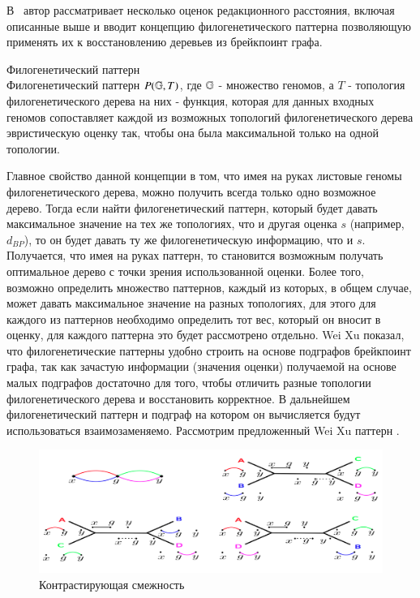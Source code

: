 В~\cite{xu2010exploring} автор рассматривает несколько оценок редакционного расстояния, включая описанные выше
и вводит концепцию филогенетического паттерна позволяющую применять их к восстановлению деревьев из брейкпоинт графа.
\begin{define}{Филогенетический паттерн} \\
  Филогенетический паттерн $P(\mathbb{G}, T)$, где $\mathbb{G}$ - множество геномов,
  а $T$ - топология филогенетического дерева на них - функция, которая для данных входных геномов
  сопоставляет каждой из возможных топологий филогенетического дерева эвристическую оценку так,
  чтобы она была максимальной только на одной топологии.
\end{define}
Главное свойство данной концепции в том, что имея на руках листовые геномы филогенетического дерева, можно получить всегда только одно возможное дерево.
Тогда если найти филогенетический паттерн, который будет давать максимальное значение на тех же топологиях,
что и другая оценка $s$ (например, $d_{BP}$), то он будет давать ту же филогенетическую информацию, что и $s$.
Получается, что имея на руках паттерн, то становится возможным получать оптимальное дерево с точки зрения использованной оценки.
Более того, возможно определить множество паттернов, каждый из которых, в общем случае, может давать максимальное значение на разных топологиях,
для этого для каждого из паттернов необходимо определить тот вес, который он вносит в оценку, для каждого паттерна это будет рассмотрено отдельно.
Wei Xu показал, что филогенетические паттерны удобно строить на основе подграфов брейкпоинт графа,
так как зачастую информации (значения оценки) получаемой на основе малых подграфов достаточно для того,
чтобы отличить разные топологии филогенетического дерева и восстановить корректное.
В дальнейшем филогенетический паттерн и подграф на котором он вычисляется будут использоваться взаимозаменяемо.
Рассмотрим предложенный Wei Xu паттерн .
\begin{figure}[H]
  \centering
  \includegraphics[max width=\linewidth]{fig/2/contrasting_adjacency.png}
  \caption{Контрастирующая смежность~\cite{xu2010exploring}}
  \label{fig:contrasting_adjacency}
\end{figure}
